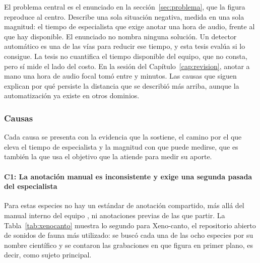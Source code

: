 El problema central es el enunciado en la sección~\ref{sec:problema}, que la
figura reproduce al centro. Describe una sola situación negativa, medida en una
sola magnitud: el tiempo de especialista que exige anotar una hora de audio,
frente al que hay disponible. El enunciado no nombra ninguna solución. Un
detector automático es una de las vías para reducir ese tiempo, y esta tesis
evalúa si lo consigue. La tesis no cuantifica el tiempo disponible del equipo,
que no consta, pero sí mide el lado del costo. En la sesión del
Capítulo~\ref{cap:revision}, anotar a mano una hora de audio focal tomó entre
\uFolderMinLow{} y \uFolderMinHigh{} minutos. Las causas que siguen explican por
qué persiste la distancia que se describió más arriba, aunque la automatización ya
existe en otros dominios.

\subsubsection{Causas}
\label{sec:causas}

Cada causa se presenta con la evidencia que la sostiene, el camino por el que
eleva el tiempo de especialista y la magnitud con que puede medirse, que es
también la que usa el objetivo que la atiende para medir su aporte.

\paragraph{C1: La anotación manual es inconsistente y exige una segunda pasada
    del especialista}
Para estas especies no hay un estándar de anotación compartido, más allá del
manual interno del equipo \citep{proyecto8_manual_2025}, ni anotaciones previas de las que partir.
La Tabla~\ref{tab:xenocanto} muestra lo segundo para Xeno-canto, el repositorio abierto de sonidos de fauna más utilizado: se buscó
cada una de las ocho especies por su nombre científico y se contaron las
grabaciones en que figura en primer plano, es decir, como sujeto principal.

